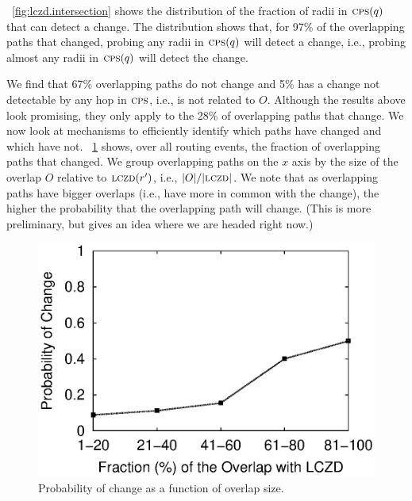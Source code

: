 

\figstr~\ref{fig:lczd.intersection} shows the distribution
of the fraction of radii in $\mathrm{\textsc{cps}}(q)$ that can detect a change.  The
distribution shows that, for 97\% of the overlapping paths that
changed, probing any radii in $\mathrm{\textsc{cps}}(q)$ will detect a change, i.e.,
probing almost any radii in $\mathrm{\textsc{cps}}(q)$ will detect the change.

  We find that 67\%
overlapping paths do not change and 5\% has a change not detectable
by any hop in $\mathrm{\textsc{cps}}$, i.e., is not related to $O$.  Although the 
results above look
promising, they only apply to the 28\% of overlapping paths that
change.  We now look at mechanisms to efficiently identify which
paths have changed and which have not.
\figstr~\ref{fig:overlap.change.prob} shows, over all routing
events, the fraction of overlapping paths that changed.  We group
overlapping paths on the $x$ axis by the size of the overlap $O$
relative to $\mathrm{\textsc{lczd}}(r')$, i.e., $|O|/|\mathrm{\textsc{lczd}}|$.  We note that as
overlapping paths have bigger overlaps (i.e., have more in common
with the change), the higher the probability that the overlapping
path will change.  (This is more preliminary, but gives an idea
where we are headed right now.)


\begin{figure}
\begin{center}
\includegraphics[width=1.05\columnwidth]{figs/patching/probchange/probchange.eps}
\caption{Probability of change as a function of overlap size.}
\label{fig:overlap.change.prob}
\end{center}
\end{figure}



